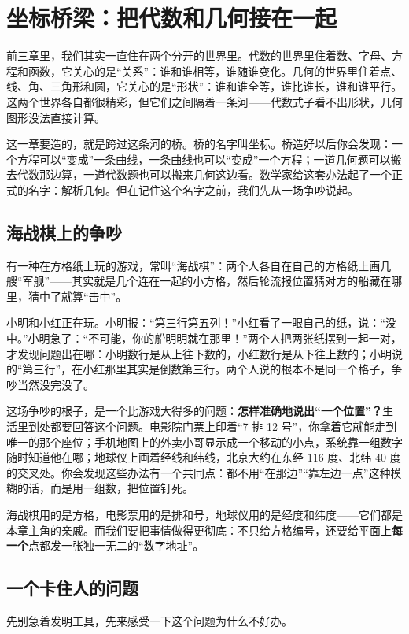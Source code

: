 \chapter{坐标桥梁：把代数和几何接在一起}

前三章里，我们其实一直住在两个分开的世界里。代数的世界里住着数、字母、方程和函数，它关心的是“关系”：谁和谁相等，谁随谁变化。几何的世界里住着点、线、角、三角形和圆，它关心的是“形状”：谁和谁全等，谁比谁长，谁和谁平行。这两个世界各自都很精彩，但它们之间隔着一条河——代数式子看不出形状，几何图形没法直接计算。

这一章要造的，就是跨过这条河的桥。桥的名字叫坐标。桥造好以后你会发现：一个方程可以“变成”一条曲线，一条曲线也可以“变成”一个方程；一道几何题可以搬去代数那边算，一道代数题也可以搬来几何这边看。数学家给这套办法起了一个正式的名字：解析几何。但在记住这个名字之前，我们先从一场争吵说起。

\section{海战棋上的争吵}

有一种在方格纸上玩的游戏，常叫“海战棋”：两个人各自在自己的方格纸上画几艘“军舰”——其实就是几个连在一起的小方格，然后轮流报位置猜对方的船藏在哪里，猜中了就算“击中”。

小明和小红正在玩。小明报：“第三行第五列！”小红看了一眼自己的纸，说：“没中。”小明急了：“不可能，你的船明明就在那里！”两个人把两张纸摆到一起一对，才发现问题出在哪：小明数行是从上往下数的，小红数行是从下往上数的；小明说的“第三行”，在小红那里其实是倒数第三行。两个人说的根本不是同一个格子，争吵当然没完没了。

这场争吵的根子，是一个比游戏大得多的问题：\textbf{怎样准确地说出“一个位置”？}生活里到处都要回答这个问题。电影院门票上印着“7 排 12 号”，你拿着它就能走到唯一的那个座位；手机地图上的外卖小哥显示成一个移动的小点，系统靠一组数字随时知道他在哪；地球仪上画着经线和纬线，北京大约在东经 $116$ 度、北纬 $40$ 度的交叉处。你会发现这些办法有一个共同点：都不用“在那边”“靠左边一点”这种模糊的话，而是用一组数，把位置钉死。

海战棋用的是方格，电影票用的是排和号，地球仪用的是经度和纬度——它们都是本章主角的亲戚。而我们要把事情做得更彻底：不只给方格编号，还要给平面上\textbf{每一个}点都发一张独一无二的“数字地址”。

\section{一个卡住人的问题}

先别急着发明工具，先来感受一下这个问题为什么不好办。

